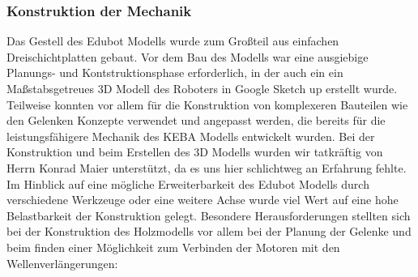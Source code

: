\subsubsection{Konstruktion der Mechanik}
Das Gestell des Edubot Modells wurde zum Großteil aus einfachen Dreischichtplatten gebaut. Vor dem Bau des Modells war eine ausgiebige Planungs- und Kontstruktionsphase erforderlich, in der auch ein ein Maßstabsgetreues 3D Modell des Roboters in Google Sketch up erstellt wurde.
Teilweise konnten vor allem für die Konstruktion von komplexeren Bauteilen wie den Gelenken Konzepte verwendet und angepasst werden, die bereits für die leistungsfähigere Mechanik des KEBA Modells entwickelt wurden.
Bei der Konstruktion und beim Erstellen des 3D Modells wurden wir tatkräftig von Herrn Konrad Maier unterstützt, da es uns hier schlichtweg an Erfahrung fehlte.
Im Hinblick auf eine mögliche Erweiterbarkeit des Edubot Modells durch verschiedene Werkzeuge oder eine weitere Achse wurde viel Wert auf eine hohe Belastbarkeit der Konstruktion gelegt.
Besondere Herausforderungen stellten sich bei der Konstruktion des Holzmodells vor allem bei der Planung der Gelenke und beim finden einer Möglichkeit zum Verbinden der Motoren mit den Wellenverlängerungen:
